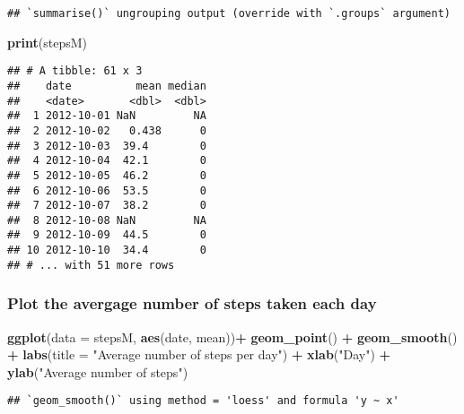 \documentclass[]{article}
\newenvironment{Shaded}{\begin{snugshade}}{\end{snugshade}}
\newcommand{\DataTypeTok}[1]{\textcolor[rgb]{0.13,0.29,0.53}{#1}}
\newcommand{\KeywordTok}[1]{\textcolor[rgb]{0.13,0.29,0.53}{\textbf{#1}}}
\newcommand{\NormalTok}[1]{#1}
\newcommand{\OperatorTok}[1]{\textcolor[rgb]{0.81,0.36,0.00}{\textbf{#1}}}
\newcommand{\StringTok}[1]{\textcolor[rgb]{0.31,0.60,0.02}{#1}}
\begin{document}
\begin{verbatim}
## `summarise()` ungrouping output (override with `.groups` argument)
\end{verbatim}

\begin{Shaded}
\begin{Highlighting}[]
\KeywordTok{print}\NormalTok{(stepsM)}
\end{Highlighting}
\end{Shaded}

\begin{verbatim}
## # A tibble: 61 x 3
##    date          mean median
##    <date>       <dbl>  <dbl>
##  1 2012-10-01 NaN         NA
##  2 2012-10-02   0.438      0
##  3 2012-10-03  39.4        0
##  4 2012-10-04  42.1        0
##  5 2012-10-05  46.2        0
##  6 2012-10-06  53.5        0
##  7 2012-10-07  38.2        0
##  8 2012-10-08 NaN         NA
##  9 2012-10-09  44.5        0
## 10 2012-10-10  34.4        0
## # ... with 51 more rows
\end{verbatim}

\hypertarget{plot-the-avergage-number-of-steps-taken-each-day}{%
\subsubsection{Plot the avergage number of steps taken each
day}\label{plot-the-avergage-number-of-steps-taken-each-day}}

\begin{Shaded}
\begin{Highlighting}[]
\KeywordTok{ggplot}\NormalTok{(}\DataTypeTok{data =}\NormalTok{ stepsM, }\KeywordTok{aes}\NormalTok{(date, mean))}\OperatorTok{+}
\StringTok{        }\KeywordTok{geom_point}\NormalTok{() }\OperatorTok{+}\StringTok{ }\KeywordTok{geom_smooth}\NormalTok{() }\OperatorTok{+}
\StringTok{        }\KeywordTok{labs}\NormalTok{(}\DataTypeTok{title =} \StringTok{"Average number of steps per day"}\NormalTok{) }\OperatorTok{+}
\StringTok{        }\KeywordTok{xlab}\NormalTok{(}\StringTok{"Day"}\NormalTok{) }\OperatorTok{+}
\StringTok{        }\KeywordTok{ylab}\NormalTok{(}\StringTok{"Average number of steps"}\NormalTok{)}
\end{Highlighting}
\end{Shaded}

\begin{verbatim}
## `geom_smooth()` using method = 'loess' and formula 'y ~ x'
\end{verbatim}
\end{document}
